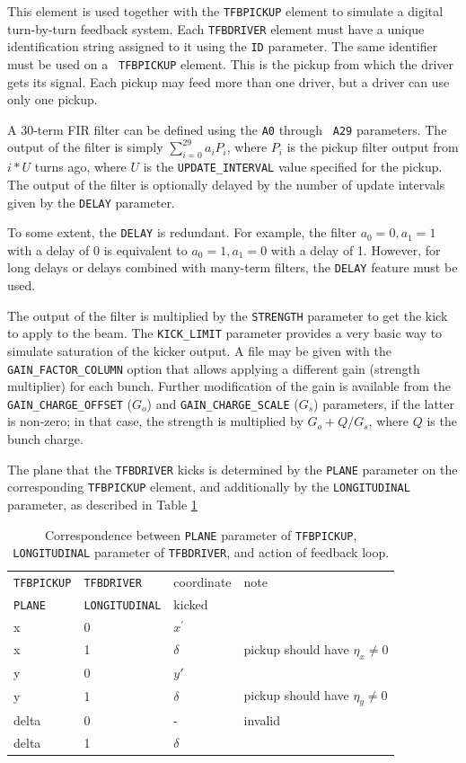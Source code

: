 This element is used together with the {\tt TFBPICKUP} element to
simulate a digital turn-by-turn feedback system.  Each {\tt TFBDRIVER}
element must have a unique identification string assigned to it using
the {\tt ID} parameter.  The same identifier must be used on a {\tt
TFBPICKUP} element.  This is the pickup from which the driver gets its
signal.  Each pickup may feed more than one driver, but a driver can
use only one pickup.

A 30-term FIR filter can be defined using the {\tt A0} through {\tt
A29} parameters.  The output of the filter is simply $\sum_{i=0}^{29}
a_i P_i$, where $P_i$ is the pickup filter output from $i*U$ turns ago,
where $U$ is the \verb|UPDATE_INTERVAL| value specified for the pickup.
The output of the filter is optionally delayed by the number of update intervals
given by the {\tt DELAY} parameter.

To some extent, the {\tt DELAY} is redundant.  For example, the filter
$a_0=0, a_1=1$ with a delay of 0 is equivalent to $a_0=1, a_1=0$ with
a delay of 1.  However, for long delays or delays combined with
many-term filters, the {\tt DELAY} feature must be used.

The output of the filter is multiplied by the {\tt STRENGTH} parameter
to get the kick to apply to the beam.  The {\tt KICK\_LIMIT} parameter
provides a very basic way to simulate saturation of the kicker output.
A file may be given with the \verb|GAIN_FACTOR_COLUMN| option
that allows applying a different gain (strength multiplier) for
each bunch.
Further modification of the gain is available from the \verb|GAIN_CHARGE_OFFSET| ($G_o$) and
\verb|GAIN_CHARGE_SCALE| ($G_s$) parameters, if the latter is non-zero; in that case, the
strength is multiplied by $G_o + Q/G_s$, where $Q$ is the bunch charge.

The plane that the \verb|TFBDRIVER| kicks is determined by the 
\verb|PLANE| parameter on the corresponding \verb|TFBPICKUP| element, and
additionally by the \verb|LONGITUDINAL| parameter, as described in 
Table \ref{tab:tfbdriver}

\begin{table}[htb]
\begin{tabular}{llll}
\hline
\verb|TFBPICKUP| & \verb|TFBDRIVER| & coordinate & note \\
\verb|PLANE| & \verb|LONGITUDINAL| & kicked & \\
\hline
x & 0 & $x^\prime$ & \\
x & 1 & $\delta$ & pickup should have $\eta_x\neq 0$ \\
y & 0 & $y\prime$ & \\
y & 1 & $\delta$ & pickup should have $\eta_y\neq 0$ \\
delta & 0 & - & invalid \\
delta & 1 & $\delta$ & \\
\hline
\end{tabular}
\caption{Correspondence between {\tt PLANE} parameter of {\tt TFBPICKUP}, {\tt LONGITUDINAL} parameter of {\tt TFBDRIVER}, and action of feedback loop.}
\label{tab:tfbdriver}
\end{table}

